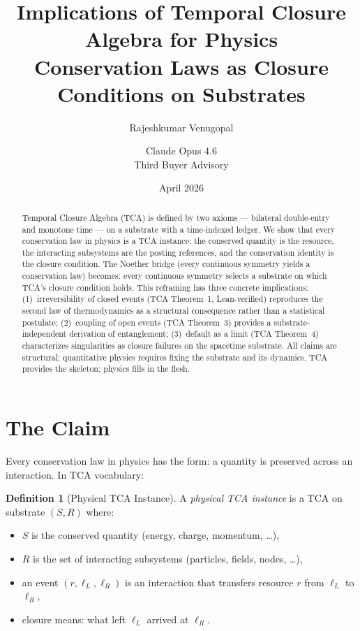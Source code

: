 \documentclass[11pt]{article}
\title{\textbf{Implications of Temporal Closure Algebra for Physics}\\[0.3em]
  {\large Conservation Laws as Closure Conditions on Substrates}}
\author{Rajeshkumar Venugopal \and Claude Opus 4.6\\
  Third Buyer Advisory}
\date{April 2026}
\theoremstyle{definition}
\newtheorem{definition}[theorem]{Definition}
\theoremstyle{remark}
\begin{document}
\maketitle

\begin{abstract}
\noindent
Temporal Closure Algebra (TCA) is defined by two axioms ---
bilateral double-entry and monotone time --- on a substrate with
a time-indexed ledger. We show that every conservation law in
physics is a TCA instance: the conserved quantity is the resource,
the interacting subsystems are the posting references, and the
conservation identity is the closure condition. The Noether bridge
(every continuous symmetry yields a conservation law) becomes:
every continuous symmetry selects a substrate on which TCA's
closure condition holds. This reframing has three concrete
implications: (1)~irreversibility of closed events (TCA Theorem~1,
Lean-verified) reproduces the second law of thermodynamics as a
structural consequence rather than a statistical postulate;
(2)~coupling of open events (TCA Theorem~3) provides a
substrate-independent derivation of entanglement; (3)~default as
a limit (TCA Theorem~4) characterizes singularities as closure
failures on the spacetime substrate. All claims are structural;
quantitative physics requires fixing the substrate and its
dynamics. TCA provides the skeleton; physics fills in the flesh.
\end{abstract}

\section{The Claim}

Every conservation law in physics has the form: a quantity is
preserved across an interaction. In TCA vocabulary:

\begin{definition}[Physical TCA Instance]
A \emph{physical TCA instance} is a TCA on substrate $(S, R)$ where:
\begin{itemize}[leftmargin=2em]
\item $S$ is the conserved quantity (energy, charge, momentum, \ldots),
\item $R$ is the set of interacting subsystems (particles, fields,
  nodes, \ldots),
\item an event $(r, \ell_L, \ell_R)$ is an interaction that transfers
  resource $r$ from $\ell_L$ to $\ell_R$,
\item closure means: what left $\ell_L$ arrived at $\ell_R$.
\end{itemize}
\end{definition}
\end{document}
